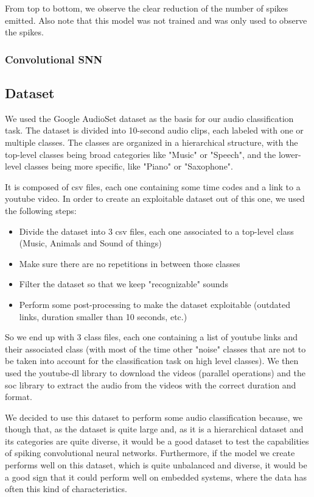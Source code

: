 \documentclass[11pt]{article}
\begin{document}
From top to bottom, we observe the clear reduction of the number of spikes emitted. Also note that this model was not trained and was only used to observe the spikes.

\subsubsection*{Convolutional SNN}




\subsection{Dataset}

We used the Google AudioSet dataset as the basis for our audio classification task. The dataset is divided into 10-second audio clips, each labeled with one or multiple classes. The classes are organized in a hierarchical structure, with the top-level classes being broad categories like "Music" or "Speech", and the lower-level classes being more specific, like "Piano" or "Saxophone".

It is composed of csv files, each one containing some time codes and a link to a youtube video. In order to create an exploitable dataset out of this one, we used the following steps:

\begin{itemize}
  \item Divide the dataset into 3 csv files, each one associated to a top-level class (Music, Animals and Sound of things)
  \item Make sure there are no repetitions in between those classes 
  \item Filter the dataset so that we keep "recognizable" sounds
  \item Perform some post-processing to make the dataset exploitable (outdated links, duration smaller than 10 seconds, etc.)
\end{itemize}

So we end up with 3 class files, each one containing a list of youtube links and their associated class (with most of the time other "noise" classes that are not to be taken into account for the classification task on high level classes). We then used the youtube-dl library to download the videos (parallel operations) and the soc library to extract the audio from the videos with the correct duration and format. 

We decided to use this dataset to perform some audio classification because, we though that, as the dataset is quite large and, as it is a hierarchical dataset and its categories are quite diverse, it would be a good dataset to test the capabilities of spiking convolutional neural networks.
Furthermore, if the model we create performs well on this dataset, which is quite unbalanced and diverse, it would be a good sign that it could perform well on embedded systems, where the data has often this kind of characteristics.
\end{document}
